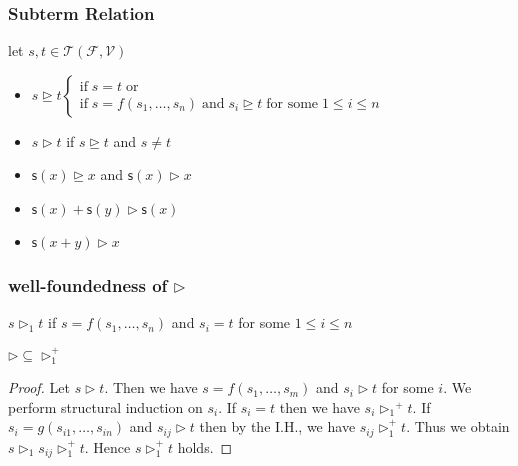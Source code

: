 \documentclass[12pt,aspectratio=169]{beamer}
\newcommand{\m}[1]{\mathsf{#1}}
\newcommand{\FF}{\mathcal{F}}
\newcommand{\VV}{\mathcal{V}}
\newcommand{\TT}{\mathcal{T}}
\begin{document}
\begin{frame}
    \frametitle{Subterm Relation}
    \begin{definition}
        let $s,t \in \TT(\FF,\VV)$
        \begin{itemize}
            \item $s \unrhd t \begin{cases}
                \text{if}\; s = t\; \text{or}\\
                \text{if}\; s = f(s_1,\dots,s_n)\; \text{and} \; s_i \unrhd t \; \text{for some} \; 1 \leq i \leq n
            \end{cases}$
            \item $s \rhd t$ if $s \unrhd t$ and $s \neq t$
        \end{itemize}
    \end{definition}

    \begin{example}
        \begin{itemize}
            \item $\m{s}(x) \unrhd x$ and $\m{s}(x) \rhd x$
            \item $\m{s}(x) + \m{s}(y) \rhd \m{s}(x)$
            \item $\m{s}(x + y) \rhd x$
        \end{itemize}
    \end{example}
\end{frame}

\begin{frame}
    \frametitle{well-foundedness of $\rhd$}

    \begin{definition}
        $s \rhd_1 t$ if $s = f(s_1,\dots,s_n)$ and $s_i = t$ for some $1 \leq i \leq n$
    \end{definition}
    \begin{lemma}
        $\rhd \subseteq \rhd_1^+$
    \end{lemma}
    \begin{proof}
        Let $s \rhd t$. Then we have $s = f(s_1,\dots,s_m)$ and $s_i \rhd t$ for some $i$.
        We perform structural induction on $s_i$.
        If $s_i = t$ then  we have $s_i {\rhd_1}^+ t$.
        If $s_i = g(s_{i1}, \dots, s_{in})$ and $s_{ij} \rhd t$ then by the I.H., we have $s_{ij} \rhd_1^+ t$.
        Thus we obtain $s \rhd_1 s_{ij} \rhd_1^+ t$. Hence $s \rhd_1^+ t$ holds.
    \end{proof}
\end{frame}
\end{document}
